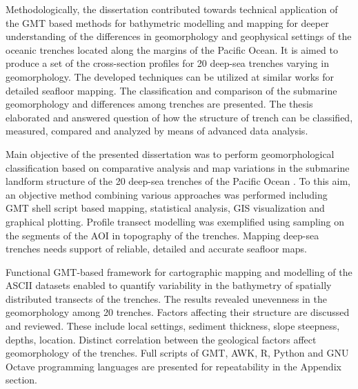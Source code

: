 \documentclass[11pt,a4paper]{report}
\begin{document}
{Methodologically, the dissertation contributed towards technical application of the \ac{GMT} based methods for bathymetric modelling and mapping for deeper understanding of the differences in geomorphology and geophysical settings of the oceanic trenches located along the margins of the Pacific Ocean. It is aimed to produce a set of the cross-section profiles for 20 deep-sea trenches varying in geomorphology. The developed techniques can be utilized at similar works for detailed seafloor mapping. The classification and comparison of the submarine geomorphology and differences among trenches are presented. The thesis elaborated and answered question of how the structure of trench can be classified, measured, compared and analyzed by means of advanced data analysis.

Main objective of the presented dissertation was to perform geomorphological classification based on comparative analysis and map variations in the submarine landform structure of the 20 deep-sea trenches of the Pacific Ocean \cite{Lemenkova202114}. To this aim, an objective method combining various approaches was performed including \ac{GMT} shell script based mapping, statistical analysis, \ac{GIS} visualization and graphical plotting. Profile transect modelling was exemplified using sampling on the segments of the \ac{AOI} in topography of the trenches. Mapping deep-sea trenches needs support of reliable, detailed and accurate seafloor maps. 

Functional \ac{GMT}-based framework for cartographic mapping and modelling of the \ac{ASCII} datasets enabled to quantify variability in the bathymetry of spatially distributed transects of the trenches. The results revealed unevenness in the geomorphology among 20 trenches. Factors affecting their structure are discussed and reviewed. These include local settings, sediment thickness, slope steepness, depths, location. Distinct correlation between the geological factors affect geomorphology of the trenches. Full scripts of \ac{GMT}, AWK, R, Python and GNU Octave programming languages are presented for repeatability in the Appendix section. 

}
\end{document}

